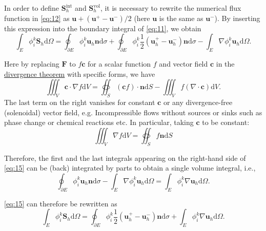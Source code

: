 \documentclass{develop-note}
\begin{document}
In order to define $\mathbf{S}_{h}^{\mathrm{int}}$ and $\mathbf{S}_{h}^{\mathrm{vol}}$, it is necessary to rewrite the numerical flux function in \autoref{eq:12} as $\mathbf{u}+(\mathbf{u}^{+}-\mathbf{u}^{-})/2$ (here $\mathbf{u}$ is the same as $\mathbf{u}^{-}$). By inserting this expression into the boundary integral of \autoref{eq:11}, we obtain
\begin{equation}
  \label{eq:15}
  \int_{E}\phi_{i}^{k}\mathbf{S}_{h}\mathrm{d}\Omega=\oint_{\partial E}\phi_{i}^{k}\mathbf{u}_{h}\mathbf{n}\mathrm{d}\sigma+\oint_{\partial E}\phi_{i}^{k}\dfrac{1}{2}(\mathbf{u}_{h}^{+}-\mathbf{u}_{h}^{-})\mathbf{n}\mathrm{d}\sigma-\int_{E}\nabla\phi_{i}^{k}\mathbf{u}_{h}\mathrm{d}\Omega.
\end{equation}

Here by replacing $\mathbf{F}$ to $f\mathbf{c}$ for a scalar function $f$ and vector field $\mathbf{c}$ in the \href{https://en.wikipedia.org/wiki/Divergence_theorem}{divergence theorem} with specific forms, we have
\begin{equation}
  \iiint_{V}\mathbf{c}\cdot\nabla f\mathrm{d}V=\oiint_{S}(\mathbf{c}f)\cdot\mathbf{n}\mathrm{d}S-\iiint_{V}f(\nabla\cdot\mathbf{c})\mathrm{d}V.
\end{equation}
The last term on the right vanishes for constant $\mathbf{c}$ or any divergence-free (solenoidal) vector field, e.g. Incompressible flows without sources or sinks such as phase change or chemical reactions etc. In particular, taking
$\mathbf{c}$ to be constant:
\begin{equation}
  \iiint_{V}\nabla f\mathrm{d}V=\oiint_{S}f\mathbf{n}\mathrm{d}S
\end{equation}

Therefore, the first and the last integrals appearing on the right-hand side of \autoref{eq:15} can be (back) integrated by parts to obtain a single volume integral, i.e.,
\begin{equation}
  \oint_{\partial E}\phi_{i}^{k}\mathbf{u}_{h}\mathbf{n}\mathrm{d}\sigma-\int_{E}\nabla\phi_{i}^{k}\mathbf{u}_{h}\mathrm{d}\Omega=\int_{E}\phi_{i}^{k}\nabla\mathbf{u}_{h}\mathrm{d}\Omega.
\end{equation}

\autoref{eq:15} can therefore be rewritten as
\begin{equation}
  \label{eq:18}
  \int_{E}\phi_{i}^{k}\mathbf{S}_{h}\mathrm{d}\Omega=\oint_{\partial E}\phi_{i}^{k}\dfrac{1}{2}(\mathbf{u}_{h}^{+}-\mathbf{u}_{h}^{-})\mathbf{n}\mathrm{d}\sigma+\int_{E}\phi_{i}^{k}\nabla\mathbf{u}_{h}\mathrm{d}\Omega.
\end{equation}
\end{document}
